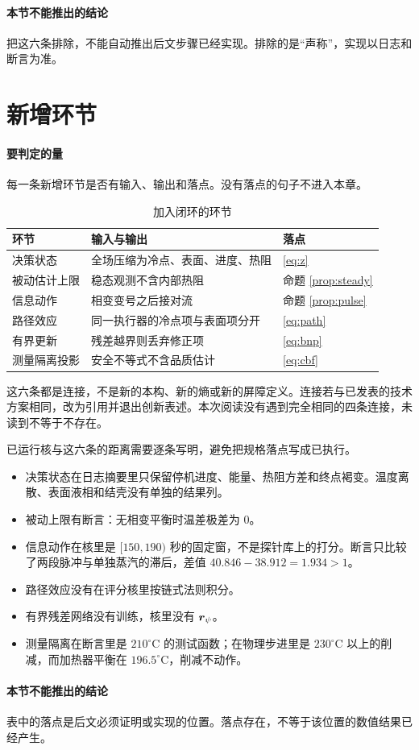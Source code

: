 \paragraph{本节不能推出的结论}
把这六条排除，不能自动推出后文步骤已经实现。排除的是“声称”，实现以日志和断言为准。

\section{新增环节}

\paragraph{要判定的量}
每一条新增环节是否有输入、输出和落点。没有落点的句子不进入本章。

\begin{table}[ht]
\centering
\caption{加入闭环的环节}
\begin{tabularx}{\textwidth}{lXX}
\toprule
环节 & 输入与输出 & 落点 \\
\midrule
决策状态 & 全场压缩为冷点、表面、进度、热阻 & \eqref{eq:z} \\
被动估计上限 & 稳态观测不含内部热阻 & 命题 \ref{prop:steady} \\
信息动作 & 相变变号之后接对流 & 命题 \ref{prop:pulse} \\
路径效应 & 同一执行器的冷点项与表面项分开 & \eqref{eq:path} \\
有界更新 & 残差越界则丢弃修正项 & \eqref{eq:bnp} \\
测量隔离投影 & 安全不等式不含品质估计 & \eqref{eq:cbf} \\
\bottomrule
\end{tabularx}
\end{table}

这六条都是连接，不是新的本构、新的熵或新的屏障定义。连接若与已发表的技术方案相同，改为引用并退出创新表述。本次阅读没有遇到完全相同的四条连接，未读到不等于不存在。

已运行核与这六条的距离需要逐条写明，避免把规格落点写成已执行。

\begin{itemize}
\item 决策状态在日志摘要里只保留停机进度、能量、热阻方差和终点褐变。温度离散、表面液相和结壳没有单独的结果列。
\item 被动上限有断言：无相变平衡时温差极差为 0。
\item 信息动作在核里是 \([150,190)\) 秒的固定窗，不是探针库上的打分。断言只比较了两段脉冲与单独蒸汽的滞后，差值 \(40.846-38.912=1.934>1\)。
\item 路径效应没有在评分核里按链式法则积分。
\item 有界残差网络没有训练，核里没有 \(\bm{r}_{\psi}\)。
\item 测量隔离在断言里是 \(210^\circ\mathrm{C}\) 的测试函数；在物理步进里是 \(230^\circ\mathrm{C}\) 以上的削减，而加热器平衡在 \(196.5^\circ\mathrm{C}\)，削减不动作。
\end{itemize}

\paragraph{本节不能推出的结论}
表中的落点是后文必须证明或实现的位置。落点存在，不等于该位置的数值结果已经产生。
